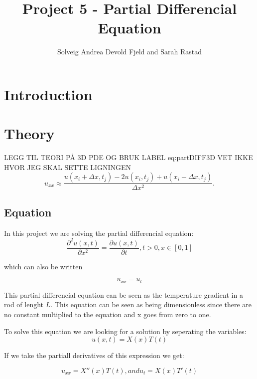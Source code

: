 \documentclass[a4paper,10pt]{article}
\title{Project 5 - Partial Differencial Equation}
\author{Solveig Andrea Devold Fjeld and Sarah Rastad}
\begin{document}
\maketitle

\begin{abstract}

\end{abstract}

\section{Introduction}


\section{Theory}
LEGG TIL TEORI PÅ 3D PDE OG BRUK LABEL eq:partDIFF3D
VET IKKE HVOR JEG SKAL SETTE LIGNINGEN
\begin{equation}
u_{xx}\approx \frac{u(x_i+\Delta x,t_j)-2u(x_i,t_j)+u(x_i-\Delta x,t_j)}{\Delta x^2}.
\label{eq:u_xx}
\end{equation}

\subsection{Equation}
In this project we are solving the partial differencial equation:
\begin{equation}
  \frac{\partial^2 u(x,t)}{\partial x^2} =\frac{\partial u(x,t)}{\partial t}, t> 0, x\in [0,1]
  \label{eq:PartDiff}
\end{equation}

which can also be written

\begin{equation}
 u_{xx}=u_t
 \label{eq:simpleDiff}
\end{equation}

This partial differencial equation can be seen as the temperature gradient in a rod of lenght $L$. This equation can be seen as being dimensionless
since there are no constant multiplied to the equation and x goes from zero to one.

To solve this equation we are looking for a solution by seperating the variables:
\begin{equation}
u(x,t) = X(x)T(t)
\label{eq:seperating}
\end{equation}

If we take the partiall derivatives of this expression we get:

\begin{equation}
u_{xx} = X''(x)T(t) ,and u_t = X(x)T'(t)
\label{eq:deriv}
\end{equation}
\end{document}

